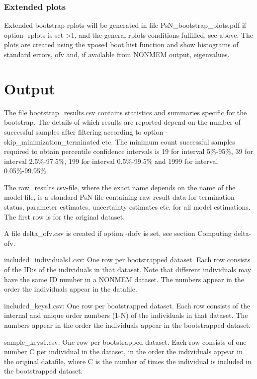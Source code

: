 \subsubsection*{Extended plots}
Extended bootstrap rplots will be generated in file PsN\_bootstrap\_plots.pdf
if option -rplots is set >1,
and the general rplots conditions fulfilled, see above.
The plots are created using the xpose4 boot.hist function
and show histograms of standard errors, ofv and, if available
from NONMEM output, eigenvalues.

\section{Output}

The file bootstrap\_results.csv contains statistics and summaries specific for the bootstrap.
The details of which results are reported depend on the number of successful samples after filtering according to
option -skip\_minimization\_terminated etc. The minimum count successful samples required to obtain
percentile confidence intervals is %
19 for interval 5\%-95\%, 39 for interval 2.5\%-97.5\%, 199 for interval 0.5\%-99.5\% and 1999 for interval 0.05\%-99.95\%.

The raw\_results csv-file, where the exact name depends on the name of the model file, 
is a standard PsN file containing raw result data for termination status, parameter estimates, uncertainty estimates etc. for all model estimations. 
The first row is for the original dataset.

A file delta\_ofv.csv is created if option -dofv is set, see section Computing delta-ofv.

included\_individuals1.csv: One row per bootstrapped dataset. Each row consists of the ID:s of the individuals in that dataset. Note that different individuals may have the same ID number in a NONMEM dataset. The numbers appear in the order the individuals appear in the datafile.

included\_keys1.csv: One row per bootstrapped dataset. Each row consists of the internal and unique order numbers (1-N) of the individuals in that dataset. The numbers appear in the order the individuals appear in the bootstrapped dataset. 

sample\_keys1.csv:  One row per bootstrapped dataset. Each row consists of one number C per individual in the dataset, in the order the individuals appear in the original datafile, where C is the number of times the individual is included in the bootstrapped dataset. 

